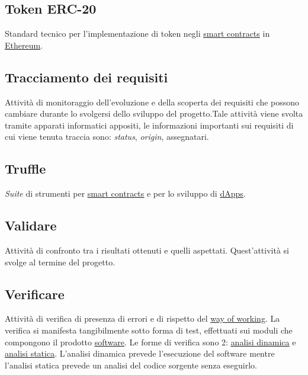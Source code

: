 	\subsection{Token ERC-20}
	\label{sec:erc20}
	Standard tecnico per l'implementazione di token negli  \underline{\hyperref[sec:smartcontracts]{smart contracts}} in  \underline{\hyperref[sec:ethereum]{Ethereum}}.

	\subsection{Tracciamento dei requisiti}
	\label{sec:tracciamentorequisiti}
	Attività di monitoraggio dell'evoluzione e della scoperta dei requisiti che possono cambiare durante lo svolgersi dello sviluppo del progetto.Tale attività viene svolta tramite apparati informatici appositi, le informazioni importanti sui requisiti di cui viene tenuta traccia sono: \emph{status}, \emph{origin}, assegnatari.

	\subsection{Truffle}
	\label{sec:truffle}
	\emph{Suite} di strumenti per \underline{\hyperref[sec:smartcontracts]{smart contracts}} e per lo sviluppo di \underline{\hyperref[sec:dapps]{dApps}}.

	\newpage

	\subsection{Validare}
	\label{sec:validare}
	Attività di confronto tra i risultati ottenuti e quelli aspettati. Quest'attività si svolge al termine del progetto.

	\subsection{Verificare}
	\label{sec:verificare}
	Attività di verifica di presenza di errori e di rispetto del \underline{\hyperref[sec:wow]{way of working}}. La verifica si manifesta tangibilmente sotto forma di test, effettuati sui moduli che compongono il prodotto \underline{\hyperref[sec:prodottosoftware]{software}}. Le forme di verifica sono 2: \hyperref[sec:analisidinamica]{\underline{analisi dinamica}} e \hyperref[sec:analisistatica]{\underline{analisi statica}}. L'analisi dinamica prevede l'esecuzione del software mentre l'analisi statica prevede un analisi del codice sorgente senza eseguirlo.

